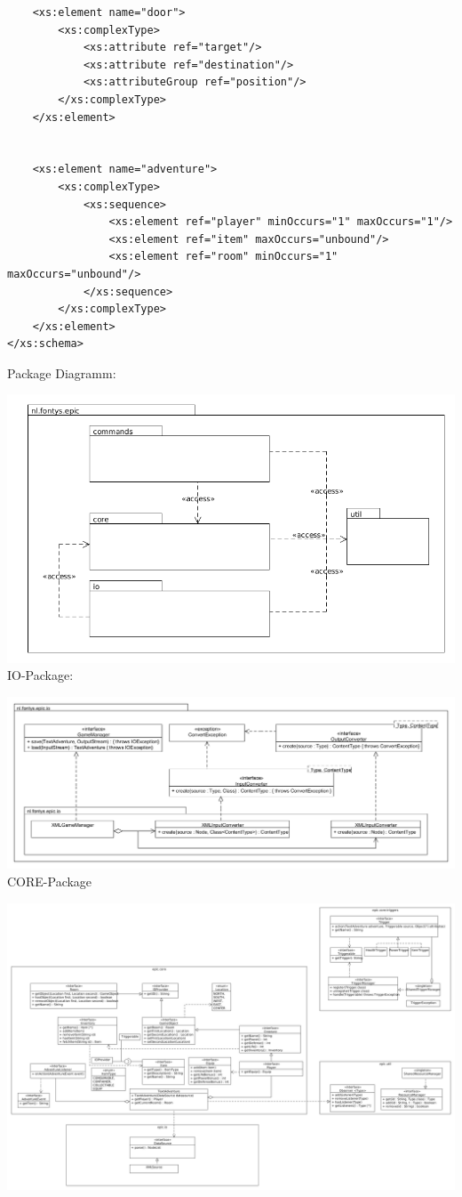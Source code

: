 \begin{lstlisting}
    <xs:element name="door">
        <xs:complexType>
            <xs:attribute ref="target"/>
            <xs:attribute ref="destination"/>
            <xs:attributeGroup ref="position"/>    
        </xs:complexType>
    </xs:element>


    <xs:element name="adventure">
        <xs:complexType>
            <xs:sequence>
                <xs:element ref="player" minOccurs="1" maxOccurs="1"/>
                <xs:element ref="item" maxOccurs="unbound"/> 
                <xs:element ref="room" minOccurs="1" maxOccurs="unbound"/>
            </xs:sequence>
        </xs:complexType>
    </xs:element>
</xs:schema>

\end{lstlisting}
Package Diagramm:

\includegraphics[scale=0.50]{assets/package-diagram.png}
IO-Package:

\includegraphics[scale=0.38]{assets/package-io.png}
CORE-Package

\includegraphics[scale=0.20]{assets/class-diagram.png}
